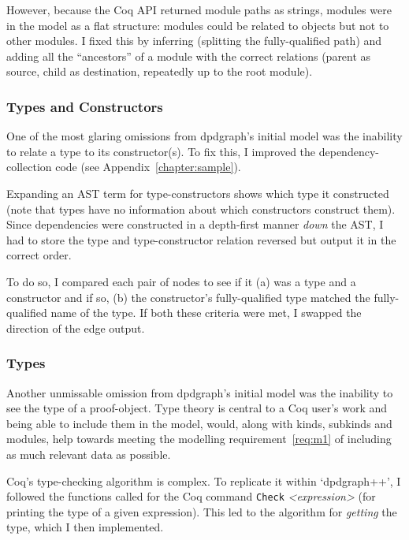 However, because the Coq API returned module paths as strings, modules were in
the model as a flat structure: modules could be related to objects but not to
other modules. I fixed this by inferring (splitting the fully-qualified path)
and adding all the ``ancestors'' of a module with the correct relations
(parent as source, child as destination, repeatedly up to the root module).

\subsubsection{Types and Constructors}\label{subsubsec:typecon}

One of the most glaring omissions from dpdgraph's initial model was the
inability to relate a type to its constructor(s). To fix this,
I improved the dependency-collection code (see Appendix~\ref{chapter:sample}).

Expanding an AST term for type-constructors shows which type it constructed
(note that types have no information about which constructors construct them).
Since dependencies were constructed in a depth-first manner \emph{down} the AST,
I had to store the type and type-constructor relation reversed but output it
in the correct order.

To do so, I compared each pair of nodes to see if it (a) was a type and a
constructor and if so, (b) the constructor's fully-qualified type matched the
fully-qualified name of the type. If both these criteria were met, I swapped the
direction of the edge output.

\subsubsection{Types}


Another unmissable omission from dpdgraph's initial model was the inability to
see the type of a proof-object. Type theory is central to a Coq user's work and
being able to include them in the model, would, along with kinds, subkinds and
modules, help towards meeting the modelling requirement~\ref{req:m1} of
including as much relevant data as possible. 

Coq's type-checking algorithm is complex. To replicate it within
`dpdgraph++', I followed the functions called for the Coq command
\texttt{Check} \emph{<expression>} (for printing the type of a given
expression).  This led to the algorithm for \emph{getting} the type, which I
then implemented.

